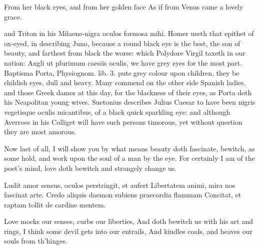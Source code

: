 From her black eyes, and from her golden face
As if from Venus came a lovely grace.

and Triton in his Milaene-nigra oculos formosa mihi. Homer
useth that epithet of ox-eyed, in describing Juno, because a round
black eye is the best, the son of beauty, and farthest from black the
worse: which Polydore Virgil taxeth in our nation: Angli ut
plurimum caesiis oculis, we have grey eyes for the most part. Baptisma
Porta, Physiognom. lib. 3. puts grey colour upon children, they be
childish eyes, dull and heavy. Many commend on the other side Spanish
ladies, and those Greek dames at this day, for the blackness of
their eyes, as Porta doth his Neapolitan young wives. Suetonius
describes Julius Caesar to have been nigris vegetisque oculis
micantibus, of a black quick sparkling eye: and although Averroes in
his Colliget will have such persons timorous, yet without question they
are most amorous.

Now last of all, I will show you by what means beauty doth fascinate,
bewitch, as some hold, and work upon the soul of a man by the eye. For
certainly I am of the poet's mind, love doth bewitch and strangely
change us.

Ludit amor sensus, oculos perstringit, et aufert
Libertatem animi, mira nos fascinat arte.
Credo aliquis daemon subiens praecordia flammam
Concitat, et raptam tollit de cardine mentem.

Love mocks our senses, curbs our liberties,
And doth bewitch us with his art and rings,
I think some devil gets into our entrails,
And kindles coals, and heaves our souls from th'hinges.

